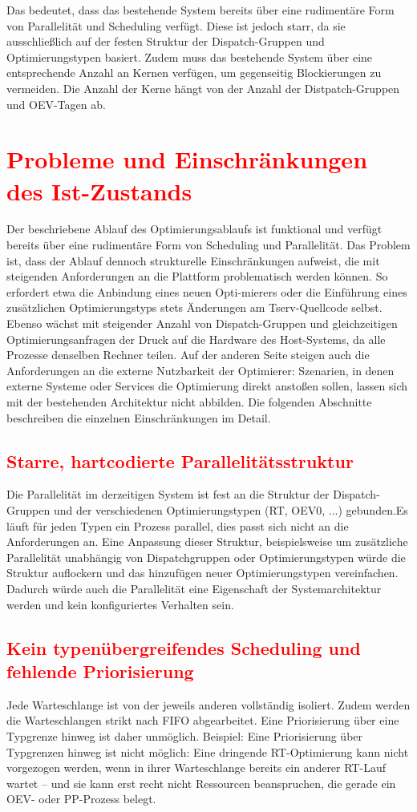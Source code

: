 Das bedeutet, dass das bestehende System bereits über eine rudimentäre Form von Parallelität und Scheduling verfügt. Diese ist jedoch starr, da sie ausschließlich auf der festen Struktur der Dispatch-Gruppen und Optimierungstypen basiert. Zudem muss das bestehende System über eine entsprechende Anzahl an Kernen verfügen, um gegenseitig Blockierungen zu vermeiden. Die Anzahl der Kerne hängt von der Anzahl der Distpatch-Gruppen und OEV-Tagen ab.

\section{\textcolor{red}{Probleme und Einschränkungen des Ist-Zustands}}
Der beschriebene Ablauf des Optimierungsablaufs ist funktional und verfügt bereits über eine rudimentäre Form von Scheduling und Parallelität. Das Problem ist, dass der Ablauf dennoch strukturelle Einschränkungen aufweist, die mit steigenden Anforderungen an die Plattform problematisch werden können. So erfordert etwa die Anbindung eines neuen Opti-mierers oder die Einführung eines zusätzlichen Optimierungstyps stets Änderungen am Tserv-Quellcode selbst. Ebenso wächst mit steigender Anzahl von Dispatch-Gruppen und gleichzeitigen Optimierungsanfragen der Druck auf die Hardware des Host-Systems, da alle Prozesse denselben Rechner teilen. Auf der anderen Seite steigen auch die Anforderungen an die externe Nutzbarkeit der Optimierer: Szenarien, in denen externe Systeme oder Services die Optimierung direkt anstoßen sollen, lassen sich mit der bestehenden Architektur nicht abbilden. Die folgenden Abschnitte beschreiben die einzelnen Einschränkungen im Detail.

\subsection{\textcolor{red}{Starre, hartcodierte Parallelitätsstruktur}}
Die Parallelität im derzeitigen System ist fest an die Struktur der Dispatch-Gruppen und der verschiedenen Optimierungstypen (RT, OEV0, ...) gebunden.Es läuft für jeden Typen ein Prozess parallel, dies passt sich nicht an die Anforderungen an. Eine Anpassung dieser Struktur, beispielsweise um zusätzliche Parallelität unabhängig von Dispatchgruppen oder Optimierungstypen würde die Struktur auflockern und das hinzufügen neuer Optimierungstypen vereinfachen. Dadurch würde auch die Parallelität eine Eigenschaft der Systemarchitektur werden und kein konfiguriertes Verhalten sein.

\subsection{\textcolor{red}{Kein typenübergreifendes Scheduling und fehlende Priorisierung}}
Jede Warteschlange ist von der jeweils anderen vollständig isoliert. Zudem werden die Warteschlangen strikt nach FIFO abgearbeitet. Eine Priorisierung über eine Typgrenze hinweg ist daher unmöglich. Beispiel: Eine Priorisierung über Typgrenzen hinweg ist nicht möglich: Eine dringende RT-Optimierung kann nicht vorgezogen werden, wenn in ihrer Warteschlange bereits ein anderer RT-Lauf wartet – und sie kann erst recht nicht Ressourcen beanspruchen, die gerade ein OEV- oder PP-Prozess belegt.

